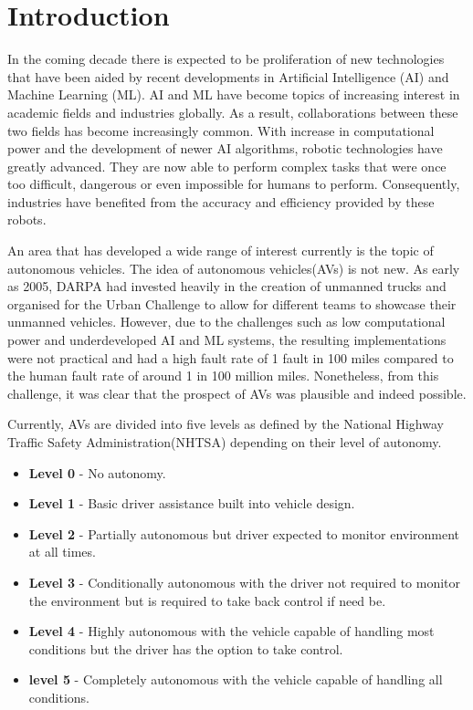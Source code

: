 %
%
\let\textcircled=\pgftextcircled
\chapter{Introduction}
\label{chap:intro}

In the coming decade there is expected to be proliferation of new technologies that have been aided by recent developments in Artificial Intelligence (AI) and Machine Learning (ML). AI and ML have become topics of increasing interest in academic fields and industries globally. As a result, collaborations between these two fields has become increasingly common. 
With increase in computational power and the development of newer AI algorithms, robotic technologies have greatly advanced. They are now able to perform complex tasks that were once too difficult, dangerous or even impossible for humans to perform. Consequently, industries have benefited from the accuracy and efficiency provided by these robots. 

An area that has developed a wide range of interest currently is the topic of autonomous vehicles. The idea of autonomous vehicles(AVs) is not new. As early as 2005, DARPA had invested heavily in the creation of unmanned trucks and organised for the Urban Challenge \cite{buehler2009darpa} to allow for different teams to showcase their unmanned vehicles. However, due to the challenges such as low computational power and underdeveloped AI and ML systems, the resulting implementations were not practical and had a high fault rate of 1 fault in 100 miles compared to the human fault rate of around 1 in 100 million miles. Nonetheless, from this challenge, it was clear that the prospect of AVs was plausible and indeed possible. 

Currently, AVs are divided into five levels as defined by the National Highway Traffic Safety Administration(NHTSA) depending on their level of autonomy. 
\begin{itemize}
	\item \textbf{Level 0} - No autonomy. 
	\item \textbf{Level 1} - Basic driver assistance built into vehicle design.
	\item \textbf{Level 2} - Partially autonomous but driver expected to monitor environment at all times.
	\item \textbf{Level 3} - Conditionally autonomous with the driver not required to monitor the environment but is required to take back control if need be.
	\item \textbf{Level 4} - Highly autonomous with the vehicle capable of handling most conditions but the driver has the option to take control. 
	\item \textbf{level 5} - Completely autonomous with the vehicle capable of handling all conditions.
\end{itemize}

